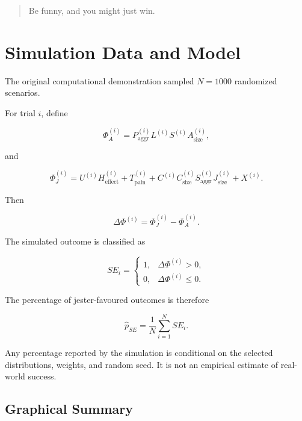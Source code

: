 \documentclass[11pt]{article}
\begin{document}
\begin{quote}
Be funny, and you might just win.
\end{quote}

\section{Simulation Data and Model}

The original computational demonstration sampled $N=1000$ randomized scenarios.

For trial $i$, define

\begin{equation}
\Phi_A^{(i)}
=
P_{\mathrm{aggr}}^{(i)}
L^{(i)}
S^{(i)}
A_{\mathrm{size}}^{(i)},
\end{equation}

and

\begin{equation}
\Phi_J^{(i)}
=
U^{(i)}H_{\mathrm{effect}}^{(i)}
+
T_{\mathrm{pain}}^{(i)}
+
C^{(i)}
C_{\mathrm{size}}^{(i)}
S_{\mathrm{aggr}}^{(i)}
J_{\mathrm{size}}^{(i)}
+
X^{(i)}.
\end{equation}

Then

\begin{equation}
\Delta\Phi^{(i)}
=
\Phi_J^{(i)}-\Phi_A^{(i)}.
\end{equation}

The simulated outcome is classified as

\begin{equation}
SE_i=
\begin{cases}
1, & \Delta\Phi^{(i)}>0,\\
0, & \Delta\Phi^{(i)}\leq 0.
\end{cases}
\end{equation}

The percentage of jester-favoured outcomes is therefore

\begin{equation}
\widehat{p}_{SE}
=
\frac{1}{N}
\sum_{i=1}^{N}
SE_i.
\label{eq:estimated-se-rate}
\end{equation}

Any percentage reported by the simulation is conditional on the selected distributions, weights, and random seed. It is not an empirical estimate of real-world success.

\subsection{Graphical Summary}
\end{document}
